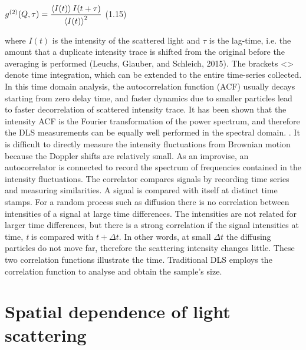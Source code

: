 \vspace{7mm}
\hspace{54mm} $g^{(2)}(Q, \tau) = \dfrac{\braket{I(t)} I (t + \tau)}{\braket{I(t)}^2}$ \hspace*{0pt}\hfill (1.15) 
\vspace{7mm}


where $I(t)$ is the intensity of the scattered light and $\tau$ is the lag-time, i.e. the amount that a duplicate intensity trace is shifted from the original before the averaging is performed (Leuchs, Glauber, and Schleich, 2015). The brackets <> denote time integration, which can be extended to the entire time-series collected. \\


In this time domain analysis, the autocorrelation function (ACF) usually decays starting from zero delay time, and faster dynamics due to smaller particles lead to faster decorrelation of scattered intensity trace. It has been shown that the intensity ACF is the Fourier transformation of the power spectrum, and therefore the DLS measurements can be equally well performed in the spectral domain. \citep{LeeS}. It is difficult to directly measure the intensity fluctuations from Brownian motion because the Doppler shifts are relatively small. As an improvise, an autocorrelator is connected to record the spectrum of frequencies contained in the intensity fluctuations. The correlator compares signals by recording time series and measuring similarities. A signal is compared with itself at distinct time stamps. For a random process such as diffusion there is no correlation between intensities of a signal at large time differences. The intensities are not related for larger time differences, but there is a strong correlation if the signal intensities at time, {\it t} is compared with {\it $t + \Delta t$}. In other words, at small $\Delta t$ the diffusing particles do not move far, therefore the scattering intensity changes little. These two correlation functions illustrate the time. Traditional DLS employs the correlation function to analyse and obtain the sample’s size.\\

\section{Spatial dependence of light scattering}

